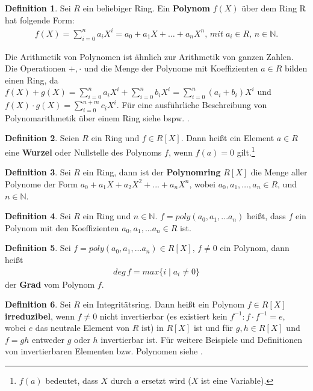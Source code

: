 \documentclass[12pt,oneside]{article}
\theoremstyle{remark}
\theoremstyle{definition}
\newtheorem{definition}{Definition}[section]
\begin{document}
\begin{definition}
Sei $R$ ein beliebiger Ring. Ein \textbf{Polynom} $f(X)$ über dem Ring R hat folgende Form:
\begin{align*}
    f(X) = \sum_{i = 0}^{n} a_{i}X^i = a_0 + a_{1} X + \dots + a_{n}X^n,\, mit \; a_{i} \in R, \, n \in \mathbb{N}.
\end{align*}

Die Arithmetik von Polynomen ist ähnlich zur Arithmetik von ganzen Zahlen. Die Operationen $+, \cdot$ und die Menge der Polynome mit Koeffizienten $a \in R$ bilden einen Ring, da $f(X) + g(X)  =  \sum_{i = 0}^{n} a_{i}X^i + \sum_{i = 0}^{n} b_{i}X^i = \sum_{i = 0}^{n} (a_{i} + b_{i})X^i$ und $f(X) \cdot g(X) = \sum_{i = 0}^{n + m} c_{i}X^i$. Für eine ausführliche Beschreibung von Polynomarithmetik über einem Ring siehe bspw. \cite{fields}. 
\end{definition}

\begin{definition}\label{polynom-ring}
Seien $R$ ein Ring und $f \in  R[X]$. Dann heißt ein Element $a \in R$ eine \textbf{Wurzel} oder Nullstelle des Polynoms $f$, wenn $f(a) = 0$ gilt.\footnote{$f(a)$ bedeutet, dass $X$ durch $a$ ersetzt wird ($X$ ist eine Variable).}
\end{definition}

\begin{definition}
Sei $R$ ein Ring, dann ist der \textbf{Polynomring} $R[X]$ die Menge aller Polynome der Form $a_{0} + a_{1}X + a_{2} X^2 + ... + a_{n}X^n$, wobei $a_{0},a_{1},\dots,a_{n} \in R$, und $n \in \mathbb{N}$.
\end{definition}

\smallskip

\begin{definition}
Sei $R$ ein Ring und $n \in \mathbb{N}$. $f = poly(a_0, a_1,...a_n)$ heißt, dass $f$ ein Polynom mit den Koeffizienten $a_0, a_1,...a_n \in R$ ist.
\end{definition}

\begin{definition}
Sei $f = poly(a_0, a_1,...a_n) \in R[X], \, f \neq 0 $ ein Polynom, dann heißt
\begin{align*}
    deg \, f = max \{ i  \mid a_i \neq 0 \}
\end{align*}
der \textbf{Grad} vom Polynom $f$.  
\end{definition}

\smallskip

\begin{definition}
Sei $R$ ein Integritätsring. Dann heißt ein Polynom  $f\in R[X]$ \textbf{irreduzibel}, wenn  $f \neq 0$  nicht invertierbar (es existiert kein $f^{-1} : f \cdot f^{-1} = e$, wobei $e$ das neutrale Element von $R$ ist) in $R[X]$ ist und für $g,h\in R[X]$ und $f=gh$ entweder $g$ oder $h$ invertierbar ist. Für weitere Beispiele und Definitionen von invertierbaren Elementen bzw. Polynomen siehe \cite{invElm}. 
\end{definition}
\end{document}
